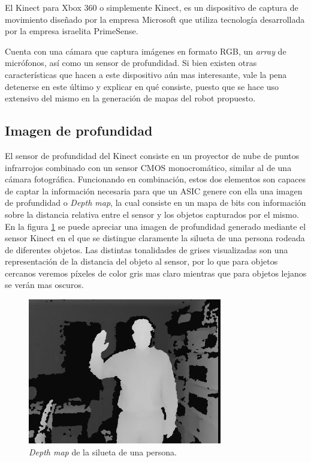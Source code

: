 El Kinect para Xbox 360 o simplemente Kinect, es un dispositivo de captura de movimiento diseñado por la empresa Microsoft que utiliza tecnología desarrollada por la empresa israelita PrimeSense.

Cuenta con una cámara que captura imágenes en formato RGB, un \textit{array} de micrófonos, así como un sensor de profundidad. Si bien existen otras características que hacen a este dispositivo aún mas interesante, vale la pena detenerse en este último y explicar en qué consiste, puesto que se hace uso extensivo del mismo en la generación de mapas del robot propuesto.

\subsection{Imagen de profundidad}

El sensor de profundidad del Kinect consiste en un proyector de nube de puntos infrarrojos combinado con un sensor CMOS monocromático, similar al de una cámara fotográfica. Funcionando en combinación, estos dos elementos son capaces de captar la información necesaria para que un ASIC genere con ella una imagen de profundidad o \textit{Depth map}, la cual consiste en un mapa de bits con información sobre la distancia relativa entre el sensor y los objetos capturados por el mismo. En la figura \ref{fig:depthMap} se puede apreciar una imagen de profundidad generado mediante el sensor Kinect en el que se distingue claramente la silueta de una persona rodeada de diferentes objetos. Las distintas tonalidades de grises visualizadas son una representación de la distancia del objeto al sensor, por lo que para objetos cercanos veremos píxeles de color gris mas claro mientras que para objetos lejanos se verán mas oscuros.

\begin{figure}[ht]
    \centering
    \includegraphics[scale=2.0]{./Figures/depth_map.png}
    \caption{\textit{Depth map} de la silueta de una persona.}
    \label{fig:depthMap}
\end{figure}

